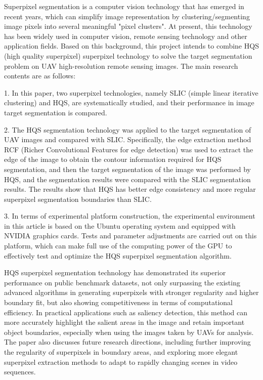 Superpixel segmentation is a computer vision technology that has emerged in recent years, which can simplify image representation by clustering/segmenting image pixels into several meaningful "pixel clusters". At present, this technology has been widely used in computer vision, remote sensing technology and other application fields. Based on this background, this project intends to combine HQS (high quality superpixel) superpixel technology to solve the target segmentation problem on UAV high-resolution remote sensing images. The main research contents are as follows:

1. In this paper, two superpixel technologies, namely SLIC (simple linear iterative clustering) and HQS, are systematically studied, and their performance in image target segmentation is compared.

2. The HQS segmentation technology was applied to the target segmentation of UAV images and compared with SLIC. Specifically, the edge extraction method RCF (Richer Convolutional Features for edge detection) was used to extract the edge of the image to obtain the contour information required for HQS segmentation, and then the target segmentation of the image was performed by HQS, and the segmentation results were compared with the SLIC segmentation results. The results show that HQS has better edge consistency and more regular superpixel segmentation boundaries than SLIC.

3. In terms of experimental platform construction, the experimental environment in this article is based on the Ubuntu operating system and equipped with NVIDIA graphics cards. Tests and parameter adjustments are carried out on this platform, which can make full use of the computing power of the GPU to effectively test and optimize the HQS superpixel segmentation algorithm.

HQS superpixel segmentation technology has demonstrated its superior performance on public benchmark datasets, not only surpassing the existing advanced algorithms in generating superpixels with stronger regularity and higher boundary fit, but also showing competitiveness in terms of computational efficiency. In practical applications such as saliency detection, this method can more accurately highlight the salient areas in the image and retain important object boundaries, especially when using the images taken by UAVs for analysis. The paper also discusses future research directions, including further improving the regularity of superpixels in boundary areas, and exploring more elegant superpixel extraction methods to adapt to rapidly changing scenes in video sequences.
